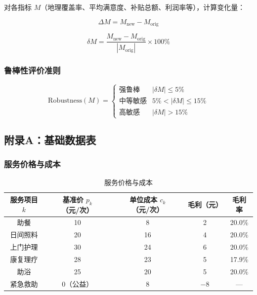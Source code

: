 \documentclass[UTF8]{ctexart}
\begin{document}
对各指标 $M$（地理覆盖率、平均满意度、补贴总额、利润率等），计算变化量：

\begin{equation}
\Delta M = M_{\text{new}} - M_{\text{orig}} \tag{4.1}
\end{equation}

\begin{equation}
\delta M = \frac{M_{\text{new}} - M_{\text{orig}}}{|M_{\text{orig}}|} \times 100\% \tag{4.2}
\end{equation}

\subsubsection{鲁棒性评价准则}

\begin{equation}
\text{Robustness}(M) = \begin{cases} \text{强鲁棒} & |\delta M| \leq 5\% \\ \text{中等敏感} & 5\% < |\delta M| \leq 15\% \\ \text{高敏感} & |\delta M| > 15\% \end{cases} \tag{4.3}
\end{equation}

\subsection{附录A：基础数据表}

\subsubsection{服务价格与成本}

\begin{table}[H]
\centering
\caption{服务价格与成本}
\renewcommand{\arraystretch}{1.3}
\begin{tabular}{|c|c|c|c|c|}
\hline
\textbf{服务项目 $k$} & \textbf{基准价 $p_k$（元/次）} & \textbf{单位成本 $c_k$（元/次）} & \textbf{毛利（元）} & \textbf{毛利率} \\
\hline
助餐 & 10 & 8 & 2 & 20.0\% \\
\hline
日间照料 & 20 & 16 & 4 & 20.0\% \\
\hline
上门护理 & 30 & 24 & 6 & 20.0\% \\
\hline
康复理疗 & 28 & 23 & 5 & 17.9\% \\
\hline
助浴 & 25 & 20 & 5 & 20.0\% \\
\hline
紧急救助 & 0（公益） & 8 & −8 & — \\
\hline
\end{tabular}
\end{table}
\end{document}
